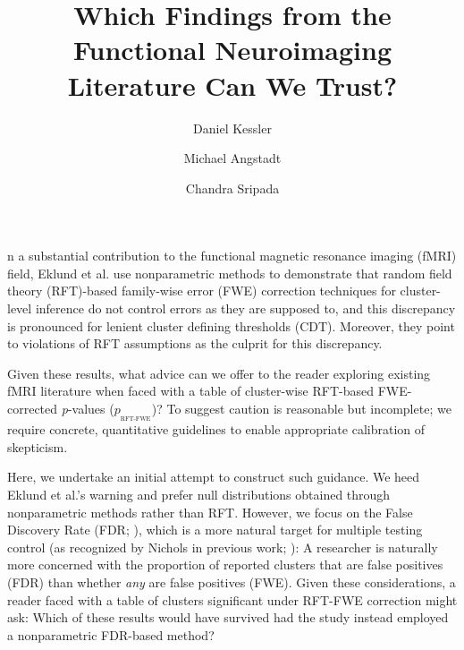 \documentclass[9pt,twocolumn,twoside]{pnas-new}
\title{Which Findings from the Functional Neuroimaging Literature Can We Trust?}
\author[a,1,2]{Daniel Kessler}
\author[a,1]{Michael Angstadt}
\author[a,1]{Chandra Sripada}
\affil[a]{Department of Psychiatry, University of Michigan, Ann Arbor}
\newcommand{\subtext}[2]{
#1_{_{\text{#2}}}
}
\begin{document}
\verticaladjustment{-2pt}

\maketitle
\thispagestyle{firststyle}




n a substantial contribution to the functional magnetic resonance imaging (fMRI) field, Eklund et al. \cite{eklund_cluster_2016} use nonparametric methods to demonstrate that random field theory (RFT)-based family-wise error (FWE) correction techniques for cluster-level inference do not control errors as they are supposed to, and this discrepancy is pronounced for lenient cluster defining thresholds (CDT). 
Moreover, they point to violations of RFT assumptions as the culprit for this discrepancy.

Given these results, what advice can we offer to the reader exploring existing fMRI literature when faced with a table of cluster-wise RFT-based FWE-corrected \textit{p}-values ($\subtext{p}{RFT-FWE}$)? 
To suggest caution is reasonable but incomplete; we require concrete, quantitative guidelines to enable appropriate calibration of skepticism.

Here, we undertake an initial attempt to construct such guidance.
We heed Eklund et al.'s warning and prefer null distributions obtained through nonparametric methods rather than RFT.
However, we focus on the False Discovery Rate (FDR; \cite{benjamini_controlling_1995}), which is a more natural target for multiple testing control (as recognized by Nichols in previous work; \cite{genovese_thresholding_2002}):
A researcher is naturally more concerned with the proportion of reported clusters that are false positives (FDR) than whether \textit{any} are false positives (FWE).
Given these considerations, a reader faced with a table of clusters significant under RFT-FWE correction might ask: Which of these results would have survived had the study instead employed a nonparametric FDR-based method?
\end{document}
